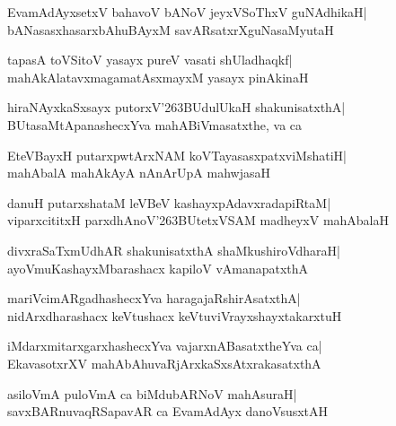 \documentclass[twoside,12pt,openright]{book}
\def\S{\char'263}
\newcounter{shloka}[chapter]
\begin{document}
\begin{shloka}%
EvamAdAyxsetxV bahavoV bANoV jeyxVSoThxV guNAdhikaH|\\
bANasasxhasarxbAhuBAyxM savARsatxrXguNasaMyutaH
\end{shloka}

\begin{shloka}%
tapasA toVSitoV yasayx pureV vasati shUladhaqkf|\\
mahAkAlatavxmagamatAsxmayxM yasayx pinAkinaH
\end{shloka}

\begin{shloka}%
hiraNAyxkaSxsayx putorxV\S BUdulUkaH shakunisatxthA|\\
BUtasaMtApanashecxYva mahABiVmasatxthe, va ca
\end{shloka}

\begin{shloka}%
EteVBayxH putarxpwtArxNAM koVTayasasxpatxviMshatiH|\\
mahAbalA mahAkAyA nAnArUpA mahwjasaH
\end{shloka}

\begin{shloka}%
danuH putarxshataM leVBeV kashayxpAdavxradapiRtaM|\\
viparxcititxH parxdhAnoV\S BUtetxVSAM madheyxV mahAbalaH
\end{shloka}

\begin{shloka}%
divxraSaTxmUdhAR shakunisatxthA shaMkushiroVdharaH|\\
ayoVmuKashayxMbarashacx kapiloV vAmanapatxthA
\end{shloka}

\begin{shloka}%
mariVcimARgadhashecxYva haragajaRshirAsatxthA|\\
nidArxdharashacx keVtushacx keVtuviVrayxshayxtakarxtuH
\end{shloka}

\begin{shloka}%
iMdarxmitarxgarxhashecxYva vajarxnABasatxtheYva ca|\\
EkavasotxrXV mahAbAhuvaRjArxkaSxsAtxrakasatxthA
\end{shloka}

\begin{shloka}%
asiloVmA puloVmA ca biMdubARNoV mahAsuraH|\\
savxBARnuvaqRSapavAR ca EvamAdAyx danoVsusxtAH
\end{shloka}
\end{document}
